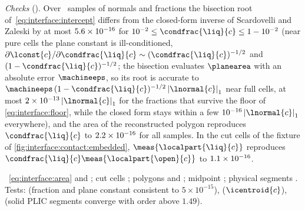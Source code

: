 \emph{Checks} (). Over \chkPlaneSamples\ samples of
normals and fractions the bisection root of~\cref{eq:interface:intercept}
differs from the closed-form inverse of Scardovelli and Zaleski by at most
$5.6\times10^{-16}$ for $10^{-2}\le\condfrac{\liq}{c}\le1-10^{-2}$ (near pure
cells the plane constant is ill-conditioned,
$\partial\lconst{c}/\partial\condfrac{\liq}{c}\sim(\condfrac{\liq}{c})^{-1/2}$ and
$(1-\condfrac{\liq}{c})^{-1/2}$; the bisection evaluates $\planearea$ with an
absolute error $\machineeps$, so its root is accurate to
$\machineeps\,(1-\condfrac{\liq}{c})^{-1/2}\abs{\lnormal{c}}_1$ near full cells, at most
$2\times10^{-13}\abs{\lnormal{c}}_1$ for the fractions that survive the floor of
\cref{eq:interface:floor}, while the closed form stays within a few
$10^{-16}\abs{\lnormal{c}}_1$ everywhere),
and the area of the reconstructed polygon reproduces $\condfrac{\liq}{c}$ to
$2.2\times10^{-16}$ for all samples. In the cut cells of the fixture of
\cref{fig:interface:contact:embedded}, $\meas{\localpart{\liq}{c}}$
reproduces $\condfrac{\liq}{c}\meas{\localpart{\open}{c}}$ to
$1.1\times10^{-16}$.



\begin{implnote}
~\cref{eq:interface:area}
and ; cut cells
; polygons
 and
; midpoint
; physical
segments . Tests:
 (fraction and plane
constant consistent to $5\times10^{-15}$),
($\icentroid{c}$),
(solid PLIC segments converge with order above $1.49$).
\end{implnote}

